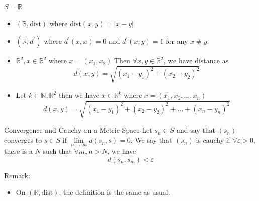 \documentclass{report}
\begin{document}
\begin{examples}
    \begin{example}
        $S = \mathbb{R}$
            \begin{itemize}
                \item $(\mathbb{R}, \text{dist})$ where $\text{dist}(x, y) = \lvert x - y \rvert$

                \item $(\mathbb{R}, d^{\prime})$ where $d^{\prime}(x, x) = 0$ and $d^{\prime}(x, y) = 1$ for any $x \neq y$.
            \end{itemize}
    \end{example}
    \begin{example}
        \begin{itemize}
            \item $\mathbb{R}^{2}, x \in \mathbb{R}^{2}$ where $x = (x_{1}, x_{2})$ Then  $\forall x, y \in \mathbb{R}^{2}$, we have distance as 
                \begin{equation*}
                    d(x, y) = \sqrt{(x_{1} - y_{1})^{2} + (x_{2} - y_{2})^{2}}
                \end{equation*}

            \item Let $k \in \mathbb{N}, \mathbb{R}^{2}$ then we have $x \in \mathbb{R}^{k}$ where $x = (x_{1}, x_{2}, \ldots , x_{n})$
                \begin{equation*}
                    d(x, y) = \sqrt{(x_{1} - y_{1})^{2} + (x_{2} - y_{2})^{2} + \ldots + (x_{n} - y_{n})^{2}}
                \end{equation*}
        \end{itemize}
    \end{example}
\end{examples}

\begin{definition}{Convergence and Cauchy on a Metric Space}
    Let $s_{n} \in S$ and say that $(s_{n})$ converges to $s \in S$ if $\lim\limits_{n \to \infty}d(s_{n}, s) = 0$. We say that $(s_{n})$ is cauchy if $\forall \varepsilon > 0$, there is a $N$ such that $\forall m, n > N$, we have 
        \begin{equation*}
            d(s_{n}, s_{m}) < \varepsilon
        \end{equation*}
\end{definition}

Remark:
    \begin{itemize}
        \item On $(\mathbb{R}, \text{dist})$, the definition is the same as usual.
    \end{itemize}
\end{document}
